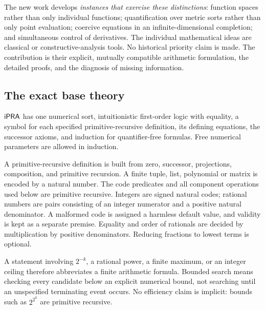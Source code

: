The new work develops \emph{instances that exercise these distinctions}:
function spaces rather than only individual functions; quantification over
metric sorts rather than only point evaluation; coercive equations in an
infinite-dimensional completion; and simultaneous control of derivatives.
The individual mathematical ideas are classical or constructive-analysis
tools. No historical priority claim is made. The contribution is their
explicit, mutually compatible arithmetic formulation, the detailed proofs,
and the diagnosis of missing information.

\subsection{The exact base theory}

\begin{definition}
\(\mathsf{iPRA}\) has one numerical sort, intuitionistic first-order logic with equality,
a symbol for each specified primitive-recursive definition, its defining
equations, the successor axioms, and induction for quantifier-free formulas.
Free numerical parameters are allowed in induction.
\end{definition}

A primitive-recursive definition is built from zero, successor, projections,
composition, and primitive recursion. A finite tuple, list, polynomial or
matrix is encoded by a natural number. The code predicates and all component
operations used below are primitive recursive. Integers are signed natural
codes; rational numbers are pairs consisting of an integer numerator and a
positive natural denominator. A malformed code is assigned a harmless default
value, and validity is kept as a separate premise. Equality and order of
rationals are decided by multiplication by positive denominators. Reducing
fractions to lowest terms is optional.

A statement involving \(2^{-k}\), a rational power, a finite maximum, or an
integer ceiling therefore abbreviates a finite arithmetic formula. Bounded
search means checking every candidate below an explicit numerical bound, not
searching until an unspecified terminating event occurs. No efficiency claim
is implicit: bounds such as \(2^{2^k}\) are primitive recursive.

